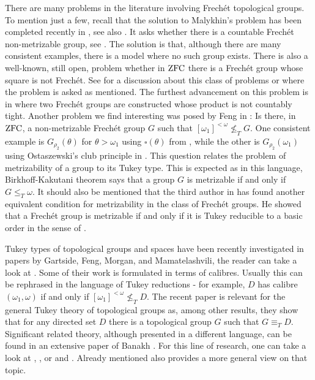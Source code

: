 \documentclass{amsart}
\theoremstyle{plain}
\theoremstyle{definition}
\numberwithin{equation}{section}
\renewcommand{\o}{\omega}
\begin{document}
There are many problems in the literature involving Frech\'et topological groups.
To mention just a few, recall that the solution to Malykhin's problem has been completed recently in \cite{malykhin}, see also \cite{hrusakshibakov}.
It asks whether there is a countable Frech\'et non-metrizable group, see \cite[Question 26]{arh}.
The solution is that, although there are many consistent examples, there is a model where no such group exists.
There is also a well-known, still open, problem whether in ${\rm ZFC}$ there is a Frech\'et group whose square is not Frech\'et.
See \cite[pp. 154]{arh} for a discussion about this class of problems or \cite[pp. 474]{shakhmatov} where the problem is asked as mentioned.
The furthest advancement on this problem is in \cite{stevoSL} where two Frech\'et groups are constructed whose product is not countably tight.
Another problem we find interesting was posed by Feng in \cite{feng}: Is there, in ${\rm ZFC}$, a non-metrizable Frech\'et group $G$ such that $[\o_1]^{<\o}\not\le_T G$.
One consistent example is $G_{\rho_{2}}(\theta)$ for $\theta>\o_1$ using $\square(\theta)$ from \cite[Theorem 4.9]{pid_fund}, while the other is $G_{\rho_2}(\omega_1)$ using Ostaszewski's club principle in \cite{mt_walks}.
This question relates the problem of metrizability of a group to its Tukey type.
This is expected as in this language, Birkhoff-Kakutani theorem says that a group $G$ is metrizable if and only if $G\le_T \o$.
It should also be mentioned that the third author in \cite{stbasic} has found another equivalent condition for metrizability in the class of Frech\'et groups.
He showed that a Frech\'et group is metrizable if and only if it is Tukey reducible to a basic order in the sense of \cite{basic}.

Tukey types of topological groups and spaces have been recently investigated in papers by Gartside, Feng, Morgan, and Mamatelashvili, the reader can take a look at \cite{gartfeng,gartmam,gartmamsubsets,gartmor,morgan}.
Some of their work is formulated in terms of calibres.
Usually this can be rephrased in the language of Tukey reductions - for example, $D$ has calibre $(\o_1,\o)$ if and only if $[\o_1]^{<\o}\not\le_T D$.
The recent paper \cite{rejection} is relevant for the general Tukey theory of topological groups as, among other results, they show that for any directed set $D$ there is a topological group $G$ such that $G\equiv_T D$.
Significant related theory, although presented in a different language, can be found in an extensive paper of Banakh \cite{banakh}.
For this line of research, one can take a look at \cite{gabkaklei}, \cite{banschu}, or \cite{dowfeng} and \cite{feng}.
Already mentioned \cite{stbasic} also provides a more general view on that topic.
\end{document}
